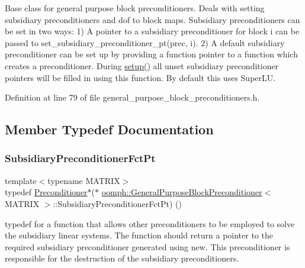 Base class for general purpose block preconditioners. Deals with setting subsidiary preconditioners and dof to block maps. Subsidiary preconditioners can be set in two ways\+: 1) A pointer to a subsidiary preconditioner for block i can be passed to set\+\_\+subsidiary\+\_\+preconditioner\+\_\+pt(prec, i). 2) A default subsidiary preconditioner can be set up by providing a function pointer to a function which creates a preconditioner. During \hyperlink{classoomph_1_1Preconditioner_af4886f4efe510e5c9b0eb19422943588}{setup()} all unset subsidiary preconditioner pointers will be filled in using this function. By default this uses Super\+LU. 

Definition at line 79 of file general\+\_\+purpose\+\_\+block\+\_\+preconditioners.\+h.



\subsection{Member Typedef Documentation}
\mbox{\label{classoomph_1_1GeneralPurposeBlockPreconditioner_a4818c6bde7206cd9b5df4f8c1e3a3c34}} 
\subsubsection{\texorpdfstring{Subsidiary\+Preconditioner\+Fct\+Pt}{SubsidiaryPreconditionerFctPt}}
{\footnotesize\ttfamily template$<$typename M\+A\+T\+R\+IX$>$ \\
typedef \hyperlink{classoomph_1_1Preconditioner}{Preconditioner}$\ast$($\ast$ \hyperlink{classoomph_1_1GeneralPurposeBlockPreconditioner}{oomph\+::\+General\+Purpose\+Block\+Preconditioner}$<$ M\+A\+T\+R\+IX $>$\+::Subsidiary\+Preconditioner\+Fct\+Pt) ()}



typedef for a function that allows other preconditioners to be employed to solve the subsidiary linear systems. The function should return a pointer to the required subsidiary preconditioner generated using new. This preconditioner is responsible for the destruction of the subsidiary preconditioners. 



